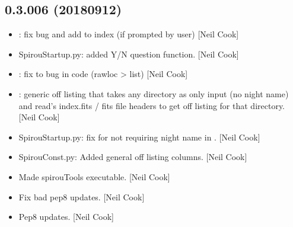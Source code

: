 \documentclass[a4paper,10pt,english]{report}
\begin{document}
\subsection{0.3.006 (2018\sphinxhyphen{}09\sphinxhyphen{}12)}
\label{\detokenize{misc/changelog:id346}}\begin{itemize}
\item {} 
: fix bug and add to index (if prompted by user) {[}Neil
Cook{]}

\item {} 
SpirouStartup.py: added Y/N question function. {[}Neil Cook{]}

\item {} 
: fix to bug in code (rawloc \textendash{}\textgreater{} list) {[}Neil Cook{]}

\item {} 
: generic off listing that takes any directory as only
input (no night name) and read’s index.fits /  fits file headers to
get off listing for that directory. {[}Neil Cook{]}

\item {} 
SpirouStartup.py: fix for not requiring night name in .
{[}Neil Cook{]}

\item {} 
SpirouConst.py: Added general off listing columns. {[}Neil Cook{]}

\item {} 
Made spirouTools executable. {[}Neil Cook{]}

\item {} 
Fix bad pep8 updates. {[}Neil Cook{]}

\item {} 
Pep8 updates. {[}Neil Cook{]}

\end{itemize}
\end{document}
